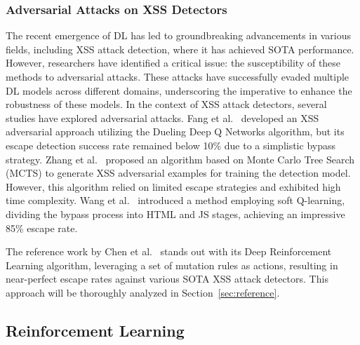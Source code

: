 \subsubsection{Adversarial Attacks on XSS Detectors}

The recent emergence of DL has led to groundbreaking advancements in various fields, including XSS attack detection, where it has achieved SOTA performance. However, researchers have identified a critical issue: the susceptibility of these methods to adversarial attacks. These attacks have successfully evaded multiple DL models across different domains, underscoring the imperative to enhance the robustness of these models. In the context of XSS attack detectors, several studies have explored adversarial attacks. Fang et al.~\cite{fang2018deepxss} developed an XSS adversarial approach utilizing the Dueling Deep Q Networks algorithm, but its escape detection success rate remained below 10\% due to a simplistic bypass strategy. Zhang et al.~\cite{zhang2020adversarial} proposed an algorithm based on Monte Carlo Tree Search (MCTS) to generate XSS adversarial examples for training the detection model. However, this algorithm relied on limited escape strategies and exhibited high time complexity. Wang et al.~\cite{wang2022black} introduced a method employing soft Q-learning, dividing the bypass process into HTML and JS stages, achieving an impressive 85\% escape rate.

The reference work by Chen et al.~\cite{CHEN2022102831} stands out with its Deep Reinforcement Learning algorithm, leveraging a set of mutation rules as actions, resulting in near-perfect escape rates against various SOTA XSS attack detectors. This approach will be thoroughly analyzed in Section~\ref{sec:reference}.




\subsection{Reinforcement Learning}

